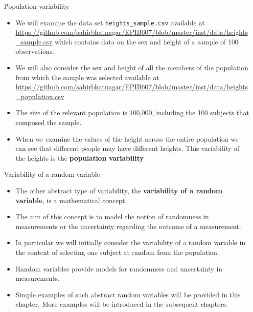 \documentclass[10pt,handout]{beamer}\usepackage[]{graphicx}\usepackage[]{color}
\begin{document}
\begin{frame}{Population variability}
	
	\begin{itemize}[<+->]
		
		\item  We will examine the data set \texttt{heights\_sample.csv} available at \url{https://github.com/sahirbhatnagar/EPIB607/blob/master/inst/data/heights_sample.csv} which contains data on the sex and height of a sample of 100 observations. 
		\item We will also consider the sex and height of all the members of the population from which the sample was selected available at \url{https://github.com/sahirbhatnagar/EPIB607/blob/master/inst/data/heights_population.csv}
		\item The size of the relevant population is 100,000, including the 100
		subjects that composed the sample. 
		\item When we examine the values of the
		height across the entire population we can see that different people may
		have different heights. This variability of the heights is the \textbf{population variability}
	\end{itemize}
	
\end{frame}


\begin{frame}{Variability of a random variable}
	
	\begin{itemize}[<+->]
		
		\item  The other abstract type of variability, the \textbf{variability of a random variable}, is a mathematical concept. 
		\item The aim of this concept is to model the notion of randomness in measurements or the uncertainty regarding
		the outcome of a measurement. 
		\item In particular we will initially consider the variability of a random variable in the context of selecting one
		subject at random from the population.
		\item Random variables provide models for randomness and uncertainty in measurements. 
		\item Simple examples of such abstract random variables will be provided in this
		chapter. More examples will be introduced in the subsequent chapters.
	\end{itemize}
	
\end{frame}
\end{document}
